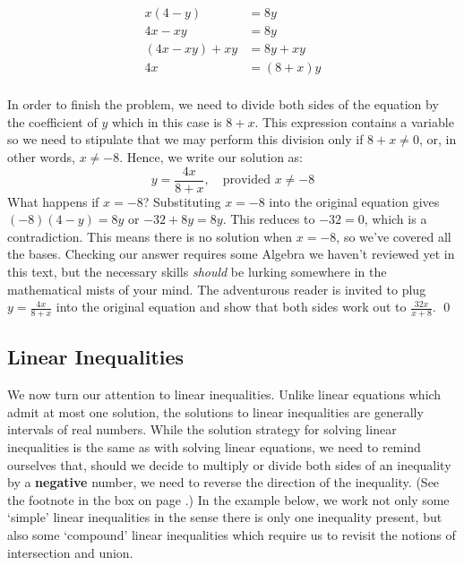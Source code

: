 \begin{ex}
\begin{enumerate}
\begin{align*}
x(4-y) & = 8y \\
4x - xy & = 8y \tag{Distribute} \\
(4x - xy) + xy & = 8y + xy \tag{Add $xy$} \\
4x & = (8+x)y \tag{Factor} \\
\end{align*}

In order to finish the problem, we need to divide both sides of the equation by the coefficient of $y$ which in this case is $8+x$.  This expression contains a variable so we need to stipulate that we may perform this division only if $8 + x \neq 0$, or, in other words, $x \neq -8$.  Hence, we write our solution as:\[ y = \dfrac{4x}{8+x}, \quad \text{provided $x \neq -8$}\] What happens if $x = -8$?  Substituting $x = -8$ into the original equation gives $(-8)(4-y) = 8y$ or $-32 + 8y = 8y$.  This reduces to $-32 = 0$, which is a contradiction.  This means there is no solution when $x = -8$, so we've covered all the bases.  Checking our answer requires some Algebra we haven't reviewed yet in this text, but the necessary skills \emph{should} be lurking somewhere in the mathematical mists of your mind.  The adventurous reader is invited to plug $y = \frac{4x}{8 + x}$ into the original equation and show that both sides work out to $\frac{32x}{x + 8}$. \qed

\end{enumerate}

\end{ex}

\subsection{Linear Inequalities}
\label{LinearInequal}

We now turn our attention to linear inequalities.  Unlike linear equations which admit at most one solution, the solutions to linear inequalities are generally intervals of real numbers.  While the solution strategy for solving linear inequalities is the same as with solving linear equations, we need to remind ourselves that, should we decide to multiply or divide both sides of an inequality by a \textbf{negative} number, we need to reverse the direction of the inequality. (See the footnote in the box on page \pageref{equivalenteqnineq}.)  In the example below, we work not only some `simple' linear inequalities in the sense there is only one inequality present, but also some `compound' linear inequalities which require us to revisit the notions of intersection and union. 

